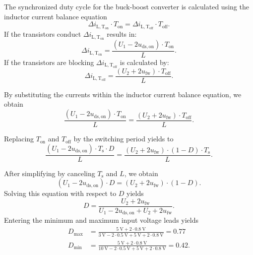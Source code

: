 \begin{solutionblock}
    The synchronized duty cycle for the buck-boost converter is calculated using the inductor current balance equation
    \begin{equation*}
        \Delta i_\mathrm{L,T_\mathrm{on}} \cdot T_\mathrm{on}=\Delta i_\mathrm{L,T_\mathrm{off}} \cdot T_\mathrm{off}.
    \end{equation*}
    If the transistors conduct $\Delta i_\mathrm{L,T_\mathrm{on}}$ results in:
    \begin{equation*}
        \Delta i_\mathrm{L,T_\mathrm{on}}=\frac{(U_\mathrm{1}-2u_\mathrm{ds,on}) \cdot T_\mathrm{on} }{L}.
    \end{equation*}
    If the transistors are blocking $\Delta i_\mathrm{L,T_\mathrm{off}}$ is calculated by:
    \begin{equation*}
        \Delta i_\mathrm{L,T_\mathrm{off}}=\frac{(U_\mathrm{2}+ 2u_\mathrm{fw}) \cdot T_\mathrm{off}}{L}.
    \end{equation*}

    By substituting the currents within the inductor current balance equation, we obtain
    \begin{equation*}
        \frac{(U_\mathrm{1}-2u_\mathrm{ds,on}) \cdot T_\mathrm{on}}{L}=\frac{(U_\mathrm{2}+2u_\mathrm{fw}) \cdot T_\mathrm{off}}{L}.
    \end{equation*}

    Replacing $T_\mathrm{on}$ and $T_\mathrm{off}$ by the switching period yields to
    \begin{equation*}
        \frac{(U_\mathrm{1}-2u_\mathrm{ds,on}) \cdot T_\mathrm{s} \cdot D}{L} =
        \frac{(U_\mathrm{2}+2u_\mathrm{fw}) \cdot (1-D) \cdot T_\mathrm{s}}{L}.
    \end{equation*}

    After simplifying by canceling $T_\mathrm{s}$ and $L$, we obtain
    \begin{equation*}
        (U_\mathrm{1}-2u_\mathrm{ds,on}) \cdot D =
        (U_\mathrm{2}+2u_\mathrm{fw}) \cdot (1-D).
    \end{equation*}
    Solving this equation with respect to $D$ yields
    \begin{equation*}
        D = \frac{U_\mathrm{2}+2u_\mathrm{fw}}{U_\mathrm{1}-2u_\mathrm{ds,on}+U_\mathrm{2}+2u_\mathrm{fw}}.
    \end{equation*}
    Entering the minimum and maximum input voltage leads yields
    \begin{align*}
        D_\mathrm{max} & = \frac{\SI{5}{\volt}+ 2 \cdot \SI{0.8}{\volt}}{\SI{3}{\volt} - 2 \cdot \SI{0.5}{\volt} + \SI{5}{\volt}+ 2 \cdot \SI{0.8}{\volt}}
        = 0.77                                                                                                                                                              \\
        D_\mathrm{min} & = \frac{\SI{5}{\volt}+ 2 \cdot \SI{0.8}{\volt}}{\SI{10}{\volt} - 2 \cdot \SI{0.5}{\volt} + \SI{5}{\volt}+ 2 \cdot \SI{0.8}{\volt}}
        = 0.42.
    \end{align*}
\end{solutionblock}

